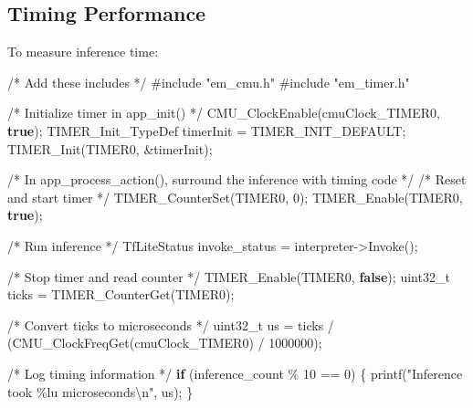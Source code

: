 \documentclass[
  9pt,
  letterpaper,
  abstract,
  titlepage]{scrbook}
\newenvironment{Shaded}{\begin{snugshade}}{\end{snugshade}}
\newcommand{\CommentTok}[1]{\textcolor[rgb]{0.37,0.37,0.37}{#1}}
\newcommand{\ControlFlowTok}[1]{\textcolor[rgb]{0.00,0.23,0.31}{\textbf{#1}}}
\newcommand{\DataTypeTok}[1]{\textcolor[rgb]{0.68,0.00,0.00}{#1}}
\newcommand{\DecValTok}[1]{\textcolor[rgb]{0.68,0.00,0.00}{#1}}
\newcommand{\ImportTok}[1]{\textcolor[rgb]{0.00,0.46,0.62}{#1}}
\newcommand{\KeywordTok}[1]{\textcolor[rgb]{0.00,0.23,0.31}{\textbf{#1}}}
\newcommand{\NormalTok}[1]{\textcolor[rgb]{0.00,0.23,0.31}{#1}}
\newcommand{\OperatorTok}[1]{\textcolor[rgb]{0.37,0.37,0.37}{#1}}
\newcommand{\PreprocessorTok}[1]{\textcolor[rgb]{0.68,0.00,0.00}{#1}}
\newcommand{\SpecialCharTok}[1]{\textcolor[rgb]{0.37,0.37,0.37}{#1}}
\newcommand{\StringTok}[1]{\textcolor[rgb]{0.13,0.47,0.30}{#1}}
\begin{document}
\subsection{Timing Performance}\label{timing-performance}

To measure inference time:

\begin{Shaded}
\begin{Highlighting}[]
\CommentTok{/* Add these includes */}
\PreprocessorTok{\#include }\ImportTok{"em\_cmu.h"}
\PreprocessorTok{\#include }\ImportTok{"em\_timer.h"}

\CommentTok{/* Initialize timer in app\_init() */}
\NormalTok{CMU\_ClockEnable}\OperatorTok{(}\NormalTok{cmuClock\_TIMER0}\OperatorTok{,} \KeywordTok{true}\OperatorTok{);}
\NormalTok{TIMER\_Init\_TypeDef timerInit }\OperatorTok{=}\NormalTok{ TIMER\_INIT\_DEFAULT}\OperatorTok{;}
\NormalTok{TIMER\_Init}\OperatorTok{(}\NormalTok{TIMER0}\OperatorTok{,} \OperatorTok{\&}\NormalTok{timerInit}\OperatorTok{);}

\CommentTok{/* In app\_process\_action(), surround the inference with timing code */}
\CommentTok{/* Reset and start timer */}
\NormalTok{TIMER\_CounterSet}\OperatorTok{(}\NormalTok{TIMER0}\OperatorTok{,} \DecValTok{0}\OperatorTok{);}
\NormalTok{TIMER\_Enable}\OperatorTok{(}\NormalTok{TIMER0}\OperatorTok{,} \KeywordTok{true}\OperatorTok{);}

\CommentTok{/* Run inference */}
\NormalTok{TfLiteStatus invoke\_status }\OperatorTok{=}\NormalTok{ interpreter}\OperatorTok{{-}\textgreater{}}\NormalTok{Invoke}\OperatorTok{();}

\CommentTok{/* Stop timer and read counter */}
\NormalTok{TIMER\_Enable}\OperatorTok{(}\NormalTok{TIMER0}\OperatorTok{,} \KeywordTok{false}\OperatorTok{);}
\DataTypeTok{uint32\_t}\NormalTok{ ticks }\OperatorTok{=}\NormalTok{ TIMER\_CounterGet}\OperatorTok{(}\NormalTok{TIMER0}\OperatorTok{);}

\CommentTok{/* Convert ticks to microseconds */}
\DataTypeTok{uint32\_t}\NormalTok{ us }\OperatorTok{=}\NormalTok{ ticks }\OperatorTok{/} \OperatorTok{(}\NormalTok{CMU\_ClockFreqGet}\OperatorTok{(}\NormalTok{cmuClock\_TIMER0}\OperatorTok{)} \OperatorTok{/} \DecValTok{1000000}\OperatorTok{);}

\CommentTok{/* Log timing information */}
\ControlFlowTok{if} \OperatorTok{(}\NormalTok{inference\_count }\OperatorTok{\%} \DecValTok{10} \OperatorTok{==} \DecValTok{0}\OperatorTok{)} \OperatorTok{\{}
\NormalTok{  printf}\OperatorTok{(}\StringTok{"Inference took }\SpecialCharTok{\%lu}\StringTok{ microseconds}\SpecialCharTok{\textbackslash{}n}\StringTok{"}\OperatorTok{,}\NormalTok{ us}\OperatorTok{);}
\OperatorTok{\}}
\end{Highlighting}
\end{Shaded}
\end{document}
